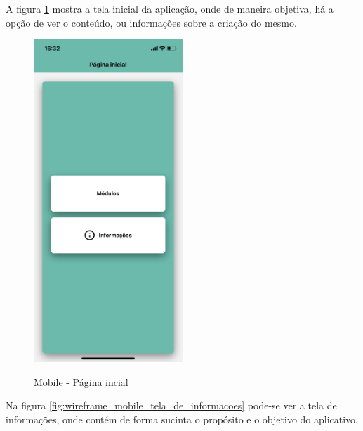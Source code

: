 A figura \ref{fig:wireframe_mobile_tela_inicial} mostra a tela inicial da aplicação, onde de maneira objetiva, há a opção de ver o conteúdo, ou informações sobre a criação do mesmo.

\begin{figure}[H]
    \centering
    \caption{Mobile - Página incial}
    \includegraphics[width=0.5\textwidth]{figuras/Mobile - pagina inicial.png}
    \label{fig:wireframe_mobile_tela_inicial}
    {}
\end{figure}

Na figura \ref{fig:wireframe_mobile_tela_de_informacoes} pode-se ver a tela de informações, onde contém de forma sucinta o propósito e o objetivo do aplicativo.

